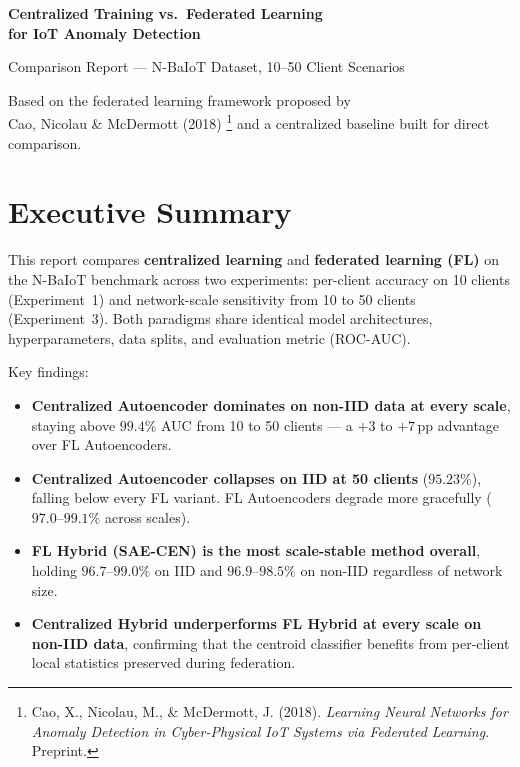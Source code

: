 \documentclass[11pt,a4paper]{article}
\begin{document}
\begin{titlepage}
  \centering\vspace*{3cm}
  {\LARGE\bfseries\color{accent}
    Centralized Training vs.\ Federated Learning\\[0.4em]
    for IoT Anomaly Detection\par}
  \vspace{1cm}
  {\large Comparison Report — N-BaIoT Dataset, 10–50 Client Scenarios\par}
  \vspace{0.5cm}
  {\normalsize\color{gray}
    Based on the federated learning framework proposed by\\
    Cao, Nicolau \& McDermott (2018)%
    \footnote{Cao, X., Nicolau, M., \& McDermott, J. (2018).
      \textit{Learning Neural Networks for Anomaly Detection
      in Cyber-Physical IoT Systems via Federated Learning}. Preprint.}
    and a centralized baseline built for direct comparison.\par}
  \vspace{2cm}{\large July 2026\par}\vfill
\end{titlepage}

\section*{Executive Summary}

This report compares \textbf{centralized learning} and \textbf{federated learning (FL)}
on the N-BaIoT benchmark across two experiments: per-client accuracy on 10 clients
(Experiment~1) and network-scale sensitivity from 10 to 50 clients (Experiment~3).
Both paradigms share identical model architectures, hyperparameters, data splits,
and evaluation metric (ROC-AUC).

Key findings:

\begin{itemize}[leftmargin=1.8em]
  \item \textbf{Centralized Autoencoder dominates on non-IID data at every scale},
        staying above $99.4\%$ AUC from 10 to 50 clients — a $+3$ to $+7$\,pp
        advantage over FL Autoencoders.
  \item \textbf{Centralized Autoencoder collapses on IID at 50 clients} ($95.23\%$),
        falling below every FL variant. FL Autoencoders degrade more gracefully
        ($97.0$–$99.1\%$ across scales).
  \item \textbf{FL Hybrid (SAE-CEN) is the most scale-stable method overall},
        holding $96.7$–$99.0\%$ on IID and $96.9$–$98.5\%$ on non-IID regardless
        of network size.
  \item \textbf{Centralized Hybrid underperforms FL Hybrid at every scale on
        non-IID data}, confirming that the centroid classifier benefits from
        per-client local statistics preserved during federation.
\end{itemize}
\end{document}
